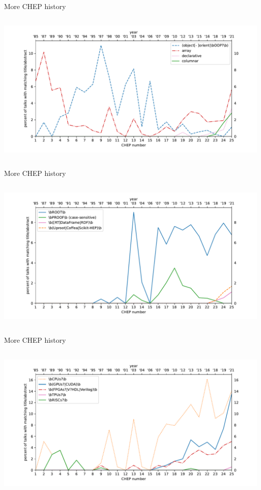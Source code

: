 \documentclass[aspectratio=169]{beamer}
\begin{document}
\begin{frame}{More CHEP history}
\vspace{0.15 cm}
\begin{columns}
\includegraphics[width=\linewidth]{PLOTS/chep-papers-paradigm.pdf}
\end{columns}
\end{frame}

\begin{frame}{More CHEP history}
\vspace{0.15 cm}
\begin{columns}
\includegraphics[width=\linewidth]{PLOTS/chep-papers-package-2.pdf}
\end{columns}
\end{frame}

\begin{frame}{More CHEP history}
\vspace{0.15 cm}
\begin{columns}
\includegraphics[width=\linewidth]{PLOTS/chep-papers-accelerator.pdf}
\end{columns}
\end{frame}
\end{document}
